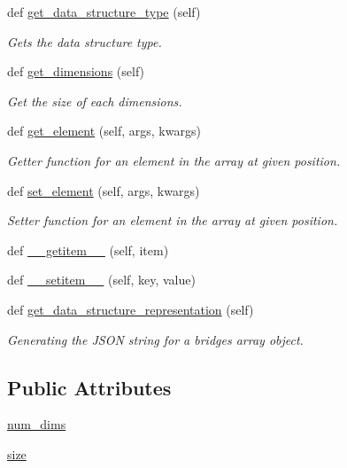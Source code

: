 \begin{DoxyCompactItemize}
def \hyperlink{classbridges_1_1array_1_1_array_a27dcb7a04798a215092f42506da679ce}{get\+\_\+data\+\_\+structure\+\_\+type} (self)
\begin{DoxyCompactList}\small\item\em Gets the data structure type. \end{DoxyCompactList}\item 
def \hyperlink{classbridges_1_1array_1_1_array_ae224fa7fe9363e2d47231e36638b500f}{get\+\_\+dimensions} (self)
\begin{DoxyCompactList}\small\item\em Get the size of each dimensions. \end{DoxyCompactList}\item 
def \hyperlink{classbridges_1_1array_1_1_array_ae02a649c2d9a1b830b36650d5a308105}{get\+\_\+element} (self, args, kwargs)
\begin{DoxyCompactList}\small\item\em Getter function for an element in the array at given position. \end{DoxyCompactList}\item 
def \hyperlink{classbridges_1_1array_1_1_array_a371bbcb9aa75562a2c3f04ef1bb33faf}{set\+\_\+element} (self, args, kwargs)
\begin{DoxyCompactList}\small\item\em Setter function for an element in the array at given position. \end{DoxyCompactList}\item 
def \hyperlink{classbridges_1_1array_1_1_array_ad97d5a2cb4bffa4a6bcdb15a3ece0974}{\+\_\+\+\_\+getitem\+\_\+\+\_\+} (self, item)
\item 
def \hyperlink{classbridges_1_1array_1_1_array_a97fd57b09a0b8ae221ecaa50c1c483b1}{\+\_\+\+\_\+setitem\+\_\+\+\_\+} (self, key, value)
\item 
def \hyperlink{classbridges_1_1array_1_1_array_a7c6af86feb0ec470afe56505d9ce0cc8}{get\+\_\+data\+\_\+structure\+\_\+representation} (self)
\begin{DoxyCompactList}\small\item\em Generating the J\+S\+ON string for a bridges array object. \end{DoxyCompactList}\end{DoxyCompactItemize}
\subsection*{Public Attributes}
\begin{DoxyCompactItemize}
\item 
\hyperlink{classbridges_1_1array_1_1_array_a2c28c3658312289dc2ae78f4099d4c76}{num\+\_\+dims}
\item 
\hyperlink{classbridges_1_1array_1_1_array_aeac1b1639d0284500f354d41b40c38f7}{size}
\end{DoxyCompactItemize}
